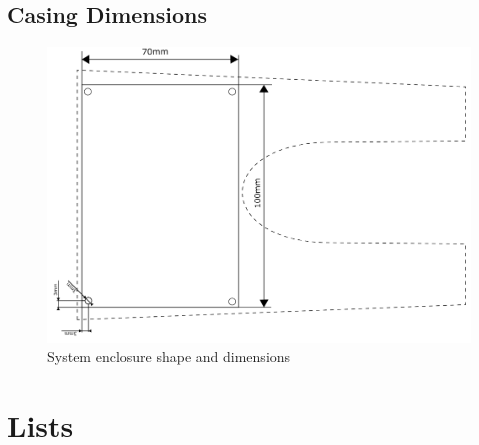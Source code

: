 \subsection{Casing Dimensions}
\begin{figure}[htb]
	\centering
    \includegraphics[width=\linewidth]{Figures/casing_dimensions.png}
	\caption{System enclosure shape and dimensions}
	\label{fig:casdim}
\end{figure}

\clearpage
\section{Lists}
